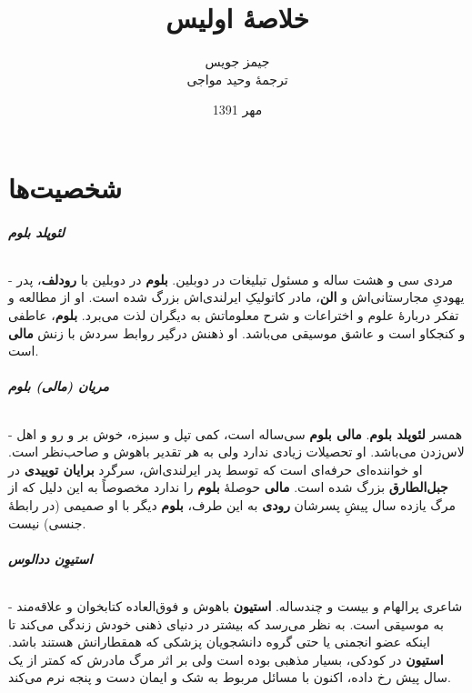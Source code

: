 \documentclass[12pt]{book}
\newcommand{\noun}[1]{{\textbf{#1}}}
\begin{document}
    \title{خلاصهٔ اولیس }
    \author{جیمز جویس\\
    ترجمهٔ وحید مواجی
    }
    \date{مهر 1391}
    \frontmatter                            %
    \maketitle                              %
    \tableofcontents                        %
    \mainmatter


    \part{شخصیت‌ها}
    \paragraph{\noun{لئوپلد بلوم}\protect{}} -
    مردی سی و هشت ساله و مسئول تبلیغات در دوبلین. \noun{بلوم} در دوبلین با \noun{رودلف}، پدر یهودیِ مجارستانی‌اش‌ و \noun{الن}، مادر کاتولیکِ ایرلندی‌اش بزرگ شده است. او از مطالعه و تفکر دربارهٔ علوم و اختراعات و شرح معلوماتش به دیگران لذت می‌برد. \noun{بلوم}، عاطفی و کنجکاو است و عاشق موسیقی می‌باشد. او ذهنش درگیر روابط سردش با زنش \noun{مالی} است.
    \paragraph{\noun{مریان (مالی) بلوم}\protect{}} -
    همسر \noun{لئوپلد بلوم}. \noun{‫مالی بلوم‬} سی‌ساله است، کمی تپل و سبزه، خوش بر و رو و اهل لاس‌زدن می‌باشد. او تحصیلات زیادی ندارد ولی به هر تقدیر باهوش و صاحب‌نظر است. او خواننده‌ای حرفه‌ای است که توسط پدر ایرلندی‌اش، سرگرد \noun{برایان توییدی} در \noun{جبل‌الطارق} بزرگ شده است. \noun{مالی} حوصلهٔ \noun{بلوم} را ندارد مخصوصاً به این دلیل که از مرگ یازده سال پیشِ پسرشان \noun{رودی} به این طرف، \noun{بلوم} دیگر با او صمیمی (در رابطهٔ جنسی) نیست.
    \paragraph{\noun{استیوِن ددالوس}\protect{}} -
    شاعری پرالهام و بیست و چندساله. \noun{استیون} باهوش و فوق‌العاده کتابخوان و علاقه‌مند به موسیقی است. به نظر می‌رسد که بیشتر در دنیای ذهنی خودش زندگی می‌کند تا اینکه عضو انجمنی یا حتی گروه دانشجویان پزشکی که همقطارانش هستند باشد. \noun{استیون} در کودکی، بسیار مذهبی بوده است ولی بر اثر مرگ مادرش که کمتر از یک سال پیش رخ داده، اکنون با مسائل مربوط به شک و ایمان دست و پنجه نرم می‌کند.
\end{document}
